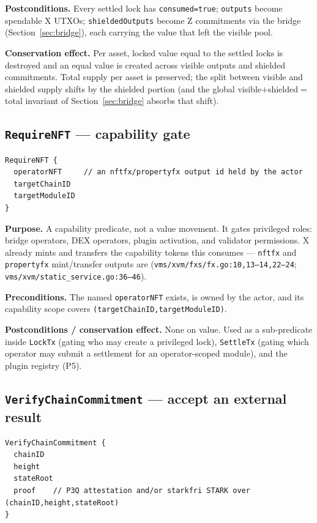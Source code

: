 \textbf{Postconditions.} Every settled lock has \texttt{consumed=true};
\texttt{outputs} become spendable X UTXOs; \texttt{shieldedOutputs}
become Z commitments via the bridge (Section~\ref{sec:bridge}), each
carrying the value that left the visible pool.

\textbf{Conservation effect.} Per asset, locked value equal to the
settled locks is destroyed and an equal value is created across
visible outputs and shielded commitments. Total supply per asset is
preserved; the split between visible and shielded supply shifts by the
shielded portion (and the global visible$+$shielded$=$total invariant of
Section~\ref{sec:bridge} absorbs that shift).

\subsection{\texttt{RequireNFT} --- capability gate}

\begin{lstlisting}
RequireNFT {
  operatorNFT     // an nftfx/propertyfx output id held by the actor
  targetChainID
  targetModuleID
}
\end{lstlisting}

\textbf{Purpose.} A capability predicate, not a value movement. It
gates privileged roles: bridge operators, DEX operators, plugin
activation, and validator permissions. X already mints and transfers
the capability tokens this consumes --- \texttt{nftfx} and
\texttt{propertyfx} mint/transfer outputs are \IMPL{}
(\texttt{vms/xvm/fxs/fx.go:10,13--14,22--24};
\texttt{vms/xvm/static\_service.go:36--46}).

\textbf{Preconditions.} The named \texttt{operatorNFT} exists, is owned
by the actor, and its capability scope covers
\texttt{(targetChainID,targetModuleID)}.

\textbf{Postconditions / conservation effect.} None on value. Used as a
sub-predicate inside \texttt{LockTx} (gating who may create a privileged
lock), \texttt{SettleTx} (gating which operator may submit a settlement
for an operator-scoped module), and the plugin registry (P5).

\subsection{\texttt{VerifyChainCommitment} --- accept an external result}

\begin{lstlisting}
VerifyChainCommitment {
  chainID
  height
  stateRoot
  proof    // P3Q attestation and/or starkfri STARK over (chainID,height,stateRoot)
}
\end{lstlisting}

